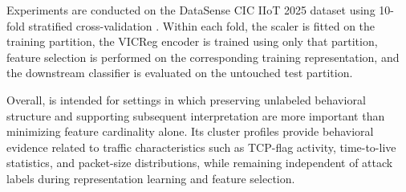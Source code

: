 Experiments are conducted on the DataSense CIC IIoT 2025 dataset using 10-fold stratified cross-validation \cite{firouzi2025datasense}. Within each fold, the scaler is fitted on the training partition, the VICReg encoder is trained using only that partition, feature selection is performed on the corresponding training representation, and the downstream classifier is evaluated on the untouched test partition. 

Overall, \method{} is intended for settings in which preserving unlabeled behavioral structure and supporting subsequent interpretation are more important than minimizing feature cardinality alone. Its cluster profiles provide behavioral evidence related to traffic characteristics such as TCP-flag activity, time-to-live statistics, and packet-size distributions, while remaining independent of attack labels during representation learning and feature selection.
